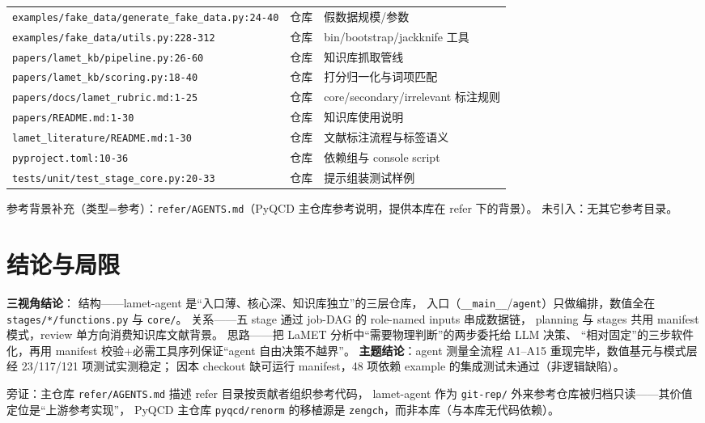 \documentclass[UTF8]{ctexart}
\begin{document}
\begin{xltabular}{\textwidth}{llX}
\texttt{\nolinkurl{examples/fake_data/generate_fake_data.py:24-40}} & 仓库 & 假数据规模/参数\\
\texttt{\nolinkurl{examples/fake_data/utils.py:228-312}} & 仓库 & bin/bootstrap/jackknife 工具\\
\texttt{\nolinkurl{papers/lamet_kb/pipeline.py:26-60}} & 仓库 & 知识库抓取管线\\
\texttt{\nolinkurl{papers/lamet_kb/scoring.py:18-40}} & 仓库 & 打分归一化与词项匹配\\
\texttt{\nolinkurl{papers/docs/lamet_rubric.md:1-25}} & 仓库 & core/secondary/irrelevant 标注规则\\
\texttt{\nolinkurl{papers/README.md:1-30}} & 仓库 & 知识库使用说明\\
\texttt{\nolinkurl{lamet_literature/README.md:1-30}} & 仓库 & 文献标注流程与标签语义\\
\texttt{\nolinkurl{pyproject.toml:10-36}} & 仓库 & 依赖组与 console script\\
\texttt{\nolinkurl{tests/unit/test_stage_core.py:20-33}} & 仓库 & 提示组装测试样例\\
\bottomrule
\end{xltabular}

参考背景补充（类型=参考）：\texttt{refer/AGENTS.md}（PyQCD 主仓库参考说明，提供本库在 refer 下的背景）。
未引入：无其它参考目录。

\section{结论与局限}

\begin{conclbox}
\textbf{三视角结论}：
\textcolor{struct}{结构}——lamet-agent 是“入口薄、核心深、知识库独立”的三层仓库，
入口（\texttt{\_\_main\_\_}/\texttt{agent}）只做编排，数值全在 \texttt{stages/*/functions.py} 与 \texttt{core/}。
\textcolor{relation}{关系}——五 stage 通过 job-DAG 的 role-named inputs 串成数据链，
planning 与 stages 共用 manifest 模式，review 单方向消费知识库文献背景。
\textcolor{idea}{思路}——把 LaMET 分析中“需要物理判断”的两步委托给 LLM 决策、
“相对固定”的三步软件化，再用 manifest 校验+必需工具序列保证“agent 自由决策不越界”。
\textbf{主题结论}：agent 测量全流程 A1--A15 重现完毕，数值基元与模式层经 23/117/121 项测试实测稳定；
因本 checkout 缺可运行 manifest，48 项依赖 example 的集成测试未通过（非逻辑缺陷）。
\end{conclbox}

\begin{refbox}
\textcolor{reference}{旁证}：主仓库 \texttt{refer/AGENTS.md} 描述 refer 目录按贡献者组织参考代码，
lamet-agent 作为 \texttt{git-rep/} 外来参考仓库被归档只读——其价值定位是“上游参考实现”，
PyQCD 主仓库 \texttt{pyqcd/renorm} 的移植源是 \texttt{zengch}，而非本库（与本库无代码依赖）。
\end{refbox}
\end{document}
